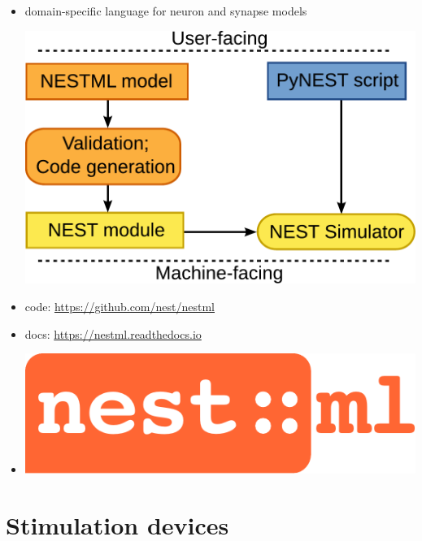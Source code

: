 \documentclass[8pt,t,usepdftitle=false]{beamer}
\begin{document}
\begin{frame}[t,plain]
  \frametitle{\ttl}
  \begin{itemize}
  \item domain-specific language for neuron and synapse models\\[3ex]    
    \begin{center}
      \includegraphics[width=0.7\linewidth]{./figures/nestml-workflow.pdf}
    \end{center}
    \vspace*{4ex}
  \item code: \url{https://github.com/nest/nestml}
  \item docs: \url{https://nestml.readthedocs.io}
  \item[] \vspace*{-5ex}\hfill\includegraphics[width=0.2\linewidth]{./figures/nestml-logo.pdf}
  \end{itemize}
\end{frame}
\def\ttl{Stimulation devices}\section{\ttl}
\end{document}

